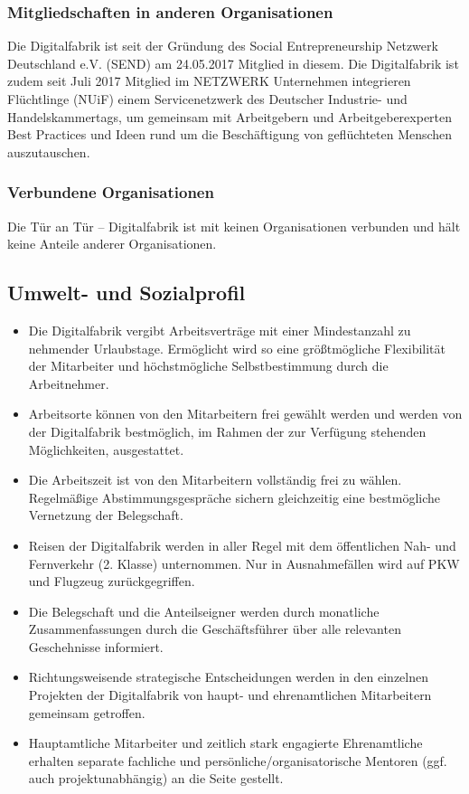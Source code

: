 \documentclass[12pt, a4paper]{article} %
\begin{document}
\hypertarget{mitgliedschaften-in-anderen-organisationen}{%
\subsubsection{Mitgliedschaften in anderen
Organisationen}\label{mitgliedschaften-in-anderen-organisationen}}

Die Digitalfabrik ist seit der Gründung des Social Entrepreneurship
Netzwerk Deutschland e.V. (SEND) am 24.05.2017 Mitglied in diesem. Die
Digitalfabrik ist zudem seit Juli 2017 Mitglied im NETZWERK Unternehmen
integrieren Flüchtlinge (NUiF) einem Servicenetzwerk des Deutscher
Industrie- und Handelskammertags, um gemeinsam mit Arbeitgebern und
Arbeitgeberexperten Best Practices und Ideen rund um die Beschäftigung
von geflüchteten Menschen auszutauschen.

\hypertarget{verbundene-organisationen}{%
\subsubsection{Verbundene
Organisationen}\label{verbundene-organisationen}}

Die Tür an Tür – Digitalfabrik ist mit keinen Organisationen verbunden
und hält keine Anteile anderer Organisationen.

\hypertarget{umwelt--und-sozialprofil}{%
\subsection{Umwelt- und
Sozialprofil}\label{umwelt--und-sozialprofil}}

\begin{itemize}
\item
Die Digitalfabrik vergibt Arbeitsverträge mit einer Mindestanzahl zu
nehmender Urlaubstage. Ermöglicht wird so eine größtmögliche
Flexibilität der Mitarbeiter und höchstmögliche Selbstbestimmung durch
die Arbeitnehmer.
\item
Arbeitsorte können von den Mitarbeitern frei gewählt werden und werden
von der Digitalfabrik bestmöglich, im Rahmen der zur Verfügung
stehenden Möglichkeiten, ausgestattet.
\item
Die Arbeitszeit ist von den Mitarbeitern vollständig frei zu wählen.
Regelmäßige Abstimmungsgespräche sichern gleichzeitig eine
bestmögliche Vernetzung der Belegschaft.
\item
Reisen der Digitalfabrik werden in aller Regel mit dem öffentlichen
Nah- und Fernverkehr (2. Klasse) unternommen. Nur in Ausnahmefällen
wird auf PKW und Flugzeug zurückgegriffen.
\item
Die Belegschaft und die Anteilseigner werden durch monatliche
Zusammenfassungen durch die Geschäftsführer über alle relevanten
Geschehnisse informiert.
\item
Richtungsweisende strategische Entscheidungen werden in den einzelnen
Projekten der Digitalfabrik von haupt- und ehrenamtlichen Mitarbeitern
gemeinsam getroffen.
\item
Hauptamtliche Mitarbeiter und zeitlich stark engagierte Ehrenamtliche
erhalten separate fachliche und persönliche/organisatorische Mentoren
(ggf. auch projektunabhängig) an die Seite gestellt.
\end{itemize}
\end{document}
